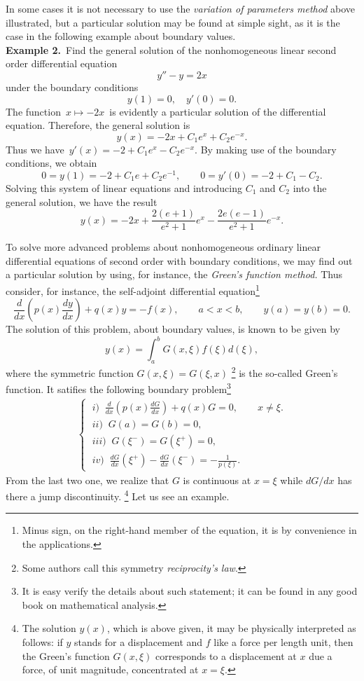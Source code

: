 \documentclass[12pt]{article}
\theoremstyle{definition}
\begin{document}
In some cases it is not necessary to use the \emph{variation of parameters method} above illustrated, but a particular solution may be found at simple sight, as it is the case in the following example about boundary values. \\

\textbf{Example 2.}\, Find the general solution of the nonhomogeneous linear second order differential equation 
$$y''-y = 2x$$
under the boundary conditions 
$$y(1) = 0,\quad y'(0) = 0.$$
The function \,$x\mapsto -2x$\, is evidently a particular solution of the differential equation.  Therefore, the general solution is
$$y(x) = -2x+C_1e^x+C_2e^{-x}.$$
Thus we have\, $y'(x) = -2+C_1e^x-C_2e^{-x}$.  By making use of the boundary conditions, we obtain
$$0 = y(1) = -2+C_1e+C_2e^{-1},\qquad 0 = y'(0) = -2+C_1-C_2.$$
Solving this system of linear equations and introducing $C_1$ and $C_2$ into the general solution, we have the result
$$y(x) = -2x+\frac{2(e+1)}{e^2+1}e^x-\frac{2e(e-1)}{e^2+1}e^{-x}.$$ 

To solve more advanced problems about nonhomogeneous ordinary linear differential equations of second order with boundary conditions, we may find out a particular solution by using, for instance, the \emph{Green's function method.}
Thus consider, for instance, the self-adjoint differential equation{\footnote{Minus sign, on the right-hand member of the equation, it is by convenience in the applications.}}
$$\frac{d}{dx}\left(p(x)\frac{dy}{dx}\right)+q(x)y=-f(x), \qquad a<x<b, \qquad y(a)=y(b)=0.$$  
The solution of this problem, about boundary values, is known to be given by
$$y(x)= \int_a^b G(x,\xi)f(\xi)d(\xi),$$
where the symmetric function $G(x,\xi)=G(\xi,x)$ {\footnote{Some authors call this symmetry \emph{reciprocity's law}.}} is the so-called Green's function. It satifies the following boundary problem{\footnote{It is easy verify the details about such statement; it can be found in any good book on mathematical analysis.}}
\begin{align*}
\begin{cases}
\; i)\;\; \frac{d}{dx}\left(p(x)\frac{dG}{dx}\right)+q(x)G=0, \qquad x\neq\xi. \\
\; ii)\;\; G(a)=G(b)=0, \\
\; iii)\;\; G(\xi^-)=G(\xi^+)=0, \\
\; iv)\;\; \frac{dG}{dx}(\xi^+)-\frac{dG}{dx}(\xi^-)=-\frac{1}{p(\xi)}.
\end{cases}
\end{align*}
From the last two one, we realize that $G$ is continuous at $x=\xi$ while $dG/dx$ has there a jump discontinuity. {\footnote{The solution $y(x)$, which is above given, it may be physically interpreted as follows: if $y$ stands for a displacement and $f$ like a force per length unit, then the Green's function $G(x,\xi)$ corresponds to a displacement at $x$ due a force, of unit magnitude, concentrated at $x=\xi$.}} Let us see an example. \\
\end{document}
